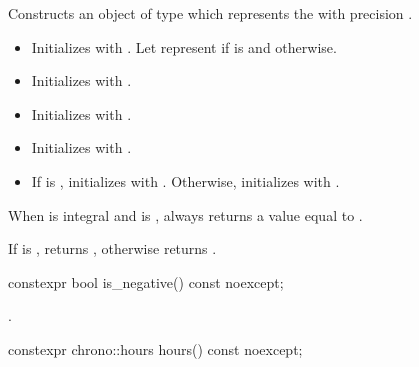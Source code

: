 \begin{itemdescr}
\pnum
\effects
Constructs an object of type 
which represents the  with precision .
\begin{itemize}
\item
  Initializes  with .
  Let  represent
   if  is  and
   otherwise.
\item
  Initializes  with .
\item
  Initializes 
  with .
\item
  Initializes 
  with .
\item
  If  is ,
  initializes  with .
  Otherwise, initializes 
  with .
\end{itemize}
\begin{note}
When  is integral and
 is ,
 always returns a value equal to .
\end{note}

\pnum
\ensures
If  is ,
 returns ,
otherwise  returns .
\end{itemdescr}

%
\begin{itemdecl}
constexpr bool is_negative() const noexcept;
\end{itemdecl}

\begin{itemdescr}
\pnum
\returns
{}.
\end{itemdescr}

%
\begin{itemdecl}
constexpr chrono::hours hours() const noexcept;
\end{itemdecl}

